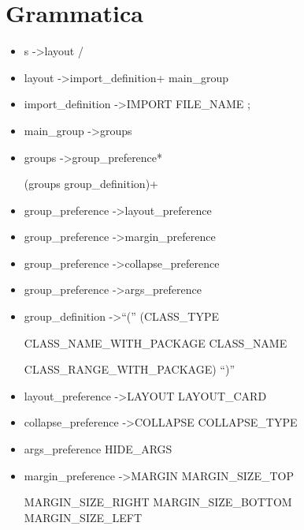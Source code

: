 \section{Grammatica}
\begin{itemize}
\item s   -\textgreater   layout  /

 \item layout   -\textgreater   import{\_}definition+	main{\_}group

 \item import{\_}definition   -\textgreater   IMPORT  FILE{\_}NAME  ;

 \item main{\_}group   -\textgreater   groups

 \item groups   -\textgreater   group{\_}preference*  
 
 (groups \textbar group{\_}definition)+

 \item group{\_}preference   -\textgreater   layout{\_}preference

 \item group{\_}preference   -\textgreater   margin{\_}preference

 \item group{\_}preference   -\textgreater   collapse{\_}preference

 \item group{\_}preference   -\textgreater   args{\_}preference

 \item group{\_}definition   -\textgreater   ``(''  (CLASS{\_}TYPE   
 
 \textbar   CLASS{\_}NAME{\_}WITH{\_}PACKAGE   \textbar   CLASS{\_}NAME   
 
 \textbar   CLASS{\_}RANGE{\_}WITH{\_}PACKAGE)  ``)''

 \item layout{\_}preference   -\textgreater   LAYOUT  LAYOUT{\_}CARD

 \item collapse{\_}preference   -\textgreater   COLLAPSE  COLLAPSE{\_}TYPE

 \item args{\_}preference  HIDE{\_}ARGS

 \item margin{\_}preference   -\textgreater   MARGIN  MARGIN{\_}SIZE{\_}TOP  
 
 MARGIN{\_}SIZE{\_}RIGHT  MARGIN{\_}SIZE{\_}BOTTOM  MARGIN{\_}SIZE{\_}LEFT


\end{itemize}
